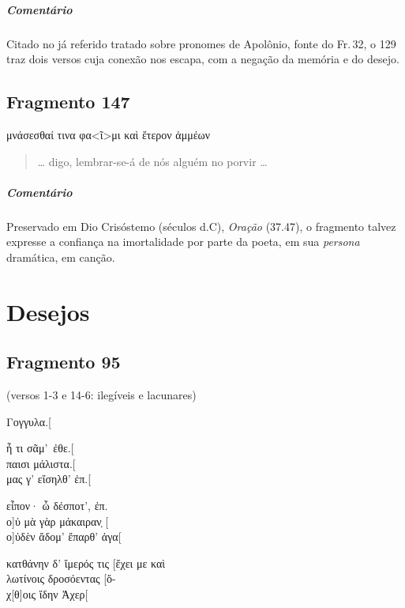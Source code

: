 \paragraph{Comentário}
Citado no já referido tratado sobre pronomes de Apolônio, fonte do Fr.\,32, o 129 traz dois versos cuja conexão nos escapa, com a negação da memória e do desejo.


\section{Fragmento 147}

\begin{gkverse}
μνάσεσθαί τινα φα<ῖ>μι \dagger{}καὶ ἔτερον\dagger{} ἀμμέων
\end{gkverse}

\begin{verse}
\ldots{} digo, lembrar-se-á de nós alguém no porvir \ldots{}
\end{verse}

{\paragraph{Comentário} Preservado em Dio Crisóstemo (séculos  d.C), \textit{Oração} (37.47), o fragmento talvez expresse a confiança na imortalidade por parte da poeta, em sua \textit{persona} dramática, em canção.}


\chapter{Desejos}

\section{Fragmento 95}

\begin{gkverse}
\textnormal{(versos 1-3 e 14-6: ilegíveis e lacunares)}

Γογγυλα.[

ἦ τι σᾶμ’ ἐθε.[\\
παισι μάλιστα.[\\
μας γ’ εἴσηλθ’ ἐπ.[

εἶπον· ὦ δέσποτ’, ἐπ.\\
ο]ὐ μὰ γὰρ μάκαιραν̣ [\\
ο]ὐδὲν ἄδομ’ ἔπαρθ’ ἀγα[

κατθάνην δ’ ἴμερός τις [ἔχει με καὶ\\
λωτίνοις δροσόεντας [ὄ-\\
χ[θ]οις ἴδην Ἀχερ[
\end{gkverse}

